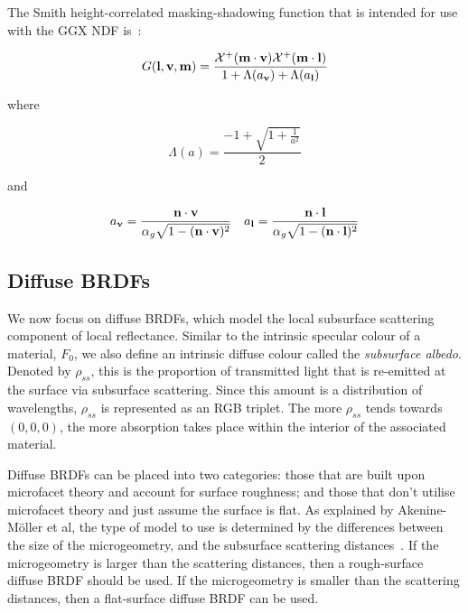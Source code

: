 The Smith height-correlated masking-shadowing function that is intended for use with the GGX NDF is~\cite{RTR4}:

\begin{equation}
	G(\mathbf{l}, \mathbf{v}, \mathbf{m}) = \frac{\mathcal{X}^+(\mathbf{m}\cdot\mathbf{v})\mathcal{X}^+(\mathbf{m}\cdot\mathbf{l})}{1 + \Lambda(a_{\mathbf{v}}) + \Lambda(a_{\mathbf{l}})}
\end{equation}

where

\begin{equation}
	\Lambda(a) = \frac{-1 + \sqrt{1 + \frac{1}{a^2}}}{2}
\end{equation}

and

\begin{gather*}
	a_{\mathbf{v}} = \frac{\mathbf{n}\cdot\mathbf{v}}{\alpha_g\sqrt{1 - (\mathbf{n}\cdot\mathbf{v})^2}}
	\quad
	a_{\mathbf{l}} = \frac{\mathbf{n}\cdot\mathbf{l}}{\alpha_g\sqrt{1 - (\mathbf{n}\cdot\mathbf{l})^2}}
\end{gather*}

\subsection{Diffuse BRDFs} \label{DiffuseBRDFs}

We now focus on diffuse BRDFs, which model the local subsurface scattering component of local reflectance. Similar to the intrinsic specular colour of a material, \begin{math}F_0\end{math}, we also define an intrinsic diffuse colour called the \textit{subsurface albedo}. Denoted by \begin{math}\rho_{ss}\end{math}, this is the proportion of transmitted light that is re-emitted at the surface via subsurface scattering. Since this amount is a distribution of wavelengths, \begin{math}\rho_{ss}\end{math} is represented as an RGB triplet. The more \begin{math}\rho_{ss}\end{math} tends towards \begin{math}(0, 0, 0)\end{math}, the more absorption takes place within the interior of the associated material.

Diffuse BRDFs can be placed into two categories: those that are built upon microfacet theory and account for surface roughness; and those that don't utilise microfacet theory and just assume the surface is flat. As explained by Akenine-M\"{o}ller et al, the type of model to use is determined by the differences between the size of the microgeometry, and the subsurface scattering distances~\cite{RTR4}. If the microgeometry is larger than the scattering distances, then a rough-surface diffuse BRDF should be used. If the microgeometry is smaller than the scattering distances, then a flat-surface diffuse BRDF can be used.

